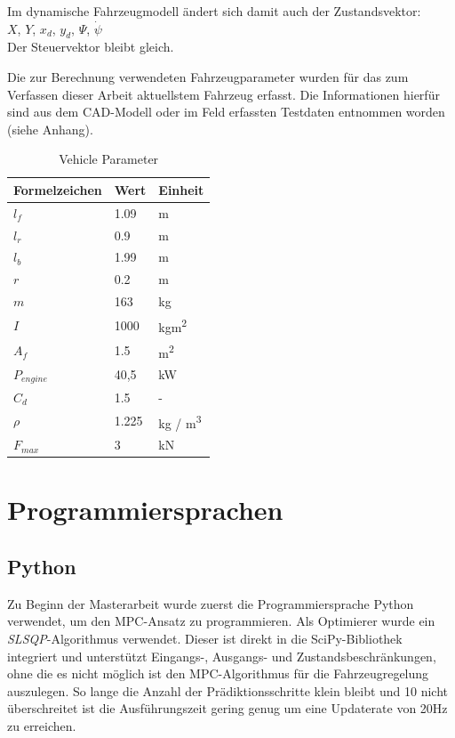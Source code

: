 \documentclass{like}
\begin{document}
Im dynamische Fahrzeugmodell ändert sich damit auch der Zustandsvektor: \\
\(X\), \(Y\), \(x_d\), \(y_d\), \(\Psi\), \(\dot{\psi}\) \\
Der Steuervektor bleibt gleich.

Die zur Berechnung verwendeten Fahrzeugparameter wurden für das zum Verfassen dieser Arbeit aktuellstem Fahrzeug erfasst. Die Informationen hierfür sind aus dem CAD-Modell oder im Feld erfassten Testdaten entnommen worden (siehe Anhang).


\begin{table}[]
	\centering
	\begin{tabular}{l|l|l}
		\hline
		Formelzeichen	& Wert & Einheit \\ \hline
		\(l_f\)	&	1.09 & m\\
		\(l_r\)	&	0.9 & m\\
		\(l_b\)	&	1.99 & m \\
		\(r\)	&	0.2 & m \\
		\(m\)	&  	163 & kg\\
		\(I\)	&  	1000 & kgm\textsuperscript{2}\\
		\(A_f\)	&  	1.5 & m\textsuperscript{2}\\
		\(P_{engine}\) &  40,5 & kW\\
		\(C_d\)	&  	1.5 & - \\
		\(\rho\)	&  	1.225 & kg / m\textsuperscript{3}\\
		\(F_{max}\)	&  	3 & kN \\ 
	\end{tabular}
	\caption{Vehicle Parameter}
	\label{vehicleParam}
\end{table}





\section{Programmiersprachen}
\subsection{Python}

Zu Beginn der Masterarbeit wurde zuerst die Programmiersprache Python verwendet, um den \ac{MPC}-Ansatz zu programmieren. Als Optimierer wurde ein \emph{\ac{SLSQP}}-Algorithmus verwendet. Dieser ist direkt in die SciPy-Bibliothek integriert und unterstützt Eingangs-, Ausgangs- und Zustandsbeschränkungen, ohne die es nicht möglich ist den \ac{MPC}-Algorithmus für die Fahrzeugregelung auszulegen. So lange die Anzahl der Prädiktionsschritte klein bleibt und 10 nicht überschreitet ist die Ausführungszeit gering genug um eine Updaterate von 20Hz zu erreichen. 
\end{document}
